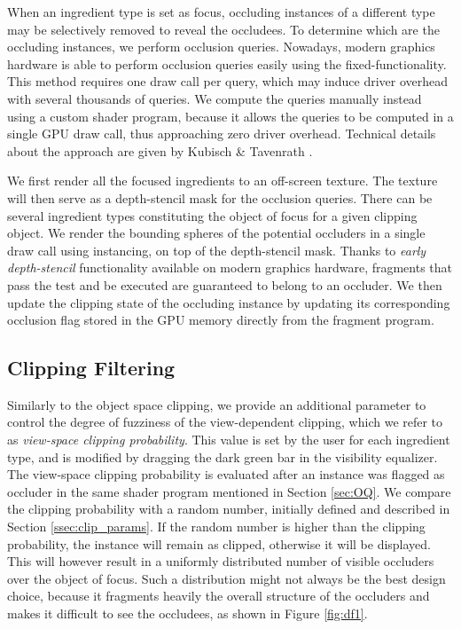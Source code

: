 When an ingredient type is set as focus, occluding instances of a different type may be selectively removed to reveal the occludees.
To determine which are the occluding instances, we perform occlusion queries. 
Nowadays, modern graphics hardware is able to perform occlusion queries easily using the fixed-functionality.
This method requires one draw call per query, which may induce driver overhead with several thousands of queries.
We compute the queries manually instead using a custom shader program, because it allows the queries to be computed in a single GPU draw call, thus approaching zero driver overhead.
Technical details about the approach are given by Kubisch \& Tavenrath \cite{kubisch2014opengl}.

We first render all the focused ingredients to an off-screen texture. 
The texture will then serve as a depth-stencil mask for the occlusion queries.
There can be several ingredient types constituting the object of focus for a given clipping object.
We render the bounding spheres of the potential occluders in a single draw call using instancing, on top of the depth-stencil mask.
Thanks to \emph{early depth-stencil} functionality available on modern graphics hardware, fragments that pass the test and be executed are guaranteed to belong to an occluder.
We then update the clipping state of the occluding instance by updating its corresponding occlusion flag stored in the GPU memory directly from the fragment \mbox{program}.


\vspace{-2mm}
\subsection{Clipping Filtering}

Similarly to the object space clipping, we provide an additional parameter to control the degree of fuzziness of the view-dependent clipping, which we refer to as \emph{view-space clipping probability}.
This value is set by the user for each ingredient type, and is modified by dragging the dark green bar in the visibility equalizer.
The view-space clipping probability is evaluated after an instance was flagged as occluder in the same shader program mentioned in Section \ref{sec:OQ}.
We compare the clipping probability with a random number, initially defined and described in Section \ref{ssec:clip_params}.
If the random number is higher than the clipping probability, the instance will remain as clipped, otherwise it will be displayed. 
This will however result in a uniformly distributed number of visible occluders over the object of focus. 
Such a distribution might not always be the best design choice, because it fragments heavily the overall structure of the occluders and makes it difficult to see the occludees, as shown in Figure \ref{fig:df1}.

